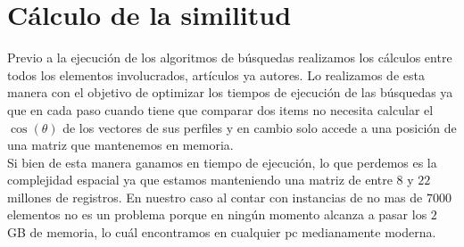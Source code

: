 \section{Cálculo de la similitud}
Previo a la ejecución de los algoritmos de búsquedas realizamos los cálculos entre todos los elementos involucrados, artículos ya autores. Lo realizamos de esta manera con el objetivo de optimizar los tiempos de ejecución de las búsquedas ya que en cada paso cuando tiene que comparar dos items no necesita calcular el $\cos(\theta)$ de los vectores de sus perfiles y en cambio solo accede a una posición de una matriz que mantenemos en memoria.\\
Si bien de esta manera ganamos en tiempo de ejecución, lo que perdemos es la complejidad espacial ya que estamos manteniendo una matriz de entre $8$ y $22$ millones de registros. En nuestro caso al contar con instancias de no mas de $7000$ elementos no es un problema porque en ningún momento alcanza a pasar los $2$ GB de memoria, lo cuál encontramos en cualquier pc medianamente moderna.\\

